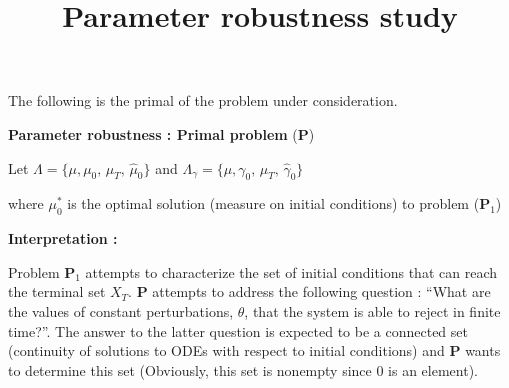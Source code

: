 \documentclass{article}
\providecommand{\supp}{\ensuremath \text{supp }}
\begin{document}
  \title{Parameter robustness study}
  \author{}
  \date{}
  \maketitle
  The following is the primal of the problem under consideration.\par
  {\bf Parameter robustness : Primal problem} ({\bf P})
\par
Let $\Lambda=\{\mu,\mu_0,\,\mu_T,\,\hat\mu_0\}$ and
$\Lambda_\gamma=\{\mu,\gamma_0,\,\mu_T,\,\hat\gamma_0\}$
where $\mu_0^*$ is the optimal solution (measure on initial conditions) to problem ({\bf P$_1$})
{\bf Interpretation :}\par
Problem {\bf P$_1$} attempts to characterize the set of initial conditions that can reach the terminal set $X_T$. {\bf P} attempts to address the following question : ``What are the values of constant perturbations, $\theta$, that the system is able to reject in finite time?''. The answer to the latter question is expected to be a connected set (continuity of solutions to ODEs with respect to initial conditions) and {\bf P} wants to determine this set (Obviously, this set is nonempty since 0 is an element).\par
\end{document}
